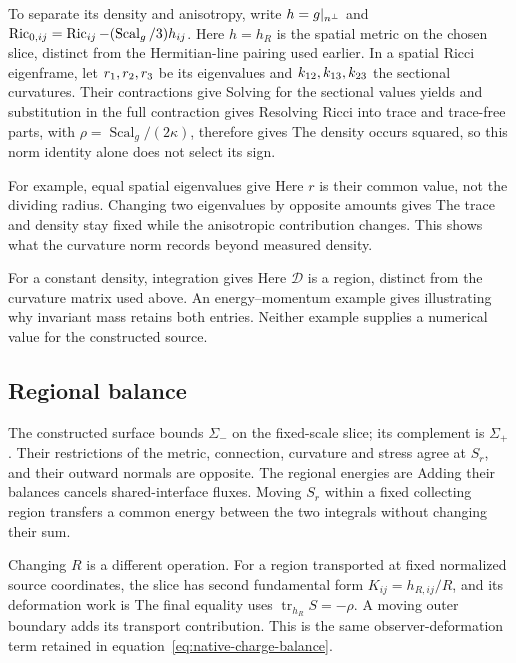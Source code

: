 To separate its density and anisotropy, write $h=g|_{n^\perp}$ and $\operatorname{Ric}_{0,ij}=\operatorname{Ric}_{ij}-(\operatorname{Scal}_g/3)h_{ij}$. Here $h=h_R$ is the spatial metric on the chosen slice, distinct from the Hermitian-line pairing used earlier. In a spatial Ricci eigenframe, let $r_1,r_2,r_3$ be its eigenvalues and $k_{12},k_{13},k_{23}$ the sectional curvatures. Their contractions give
\NativeRicciSectionalDisplay
Solving for the sectional values yields
\NativeSectionalSolutionDisplay
and substitution in the full contraction gives
\NativeSpatialRicciEnergyDisplay
Resolving Ricci into trace and trace-free parts, with $\rho=\operatorname{Scal}_g/(2\kappa)$, therefore gives
\NativeDensityIdentityDisplay
The density occurs squared, so this norm identity alone does not select its sign.

For example, equal spatial eigenvalues give
\SpectrumIsotropicExampleDisplay
Here $r$ is their common value, not the dividing radius. Changing two eigenvalues by opposite amounts gives
\SpectrumAnisotropyExampleDisplay
The trace and density stay fixed while the anisotropic contribution changes. This shows what the curvature norm records beyond measured density.

For a constant density, integration gives
\SpectrumRegionExampleDisplay
Here $\mathcal D$ is a region, distinct from the curvature matrix used above. An energy--momentum example gives
\SpectrumMassExampleDisplay
illustrating why invariant mass retains both entries. Neither example supplies a numerical value for the constructed source.

\subsection{Regional balance}
The constructed surface bounds $\Sigma_-$ on the fixed-scale slice; its complement is $\Sigma_+$. Their restrictions of the metric, connection, curvature and stress agree at $S_r$, and their outward normals are opposite. The regional energies are
\SourceRegionalEnergiesDisplay
Adding their balances cancels shared-interface fluxes. Moving $S_r$ within a fixed collecting region transfers a common energy between the two integrals without changing their sum.

Changing $R$ is a different operation. For a region transported at fixed normalized source coordinates, the slice has second fundamental form $K_{ij}=h_{R,ij}/R$, and its deformation work is
\SourceObserverWorkDisplay
The final equality uses $\operatorname{tr}_{h_R}S=-\rho$. A moving outer boundary adds its transport contribution. This is the same observer-deformation term retained in equation~\eqref{eq:native-charge-balance}.

